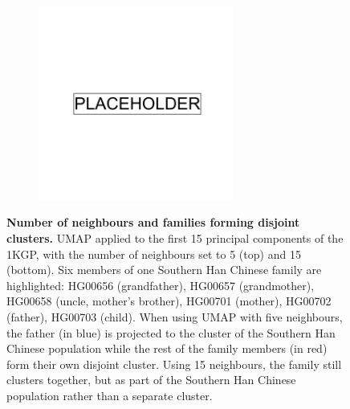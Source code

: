 \newpage

\begin{figure}
    \centering
    \begin{subfigure}{\textwidth}
    \includegraphics[width=0.7\textwidth]{placeholder.png}
    \end{subfigure}
    \caption[Number of neighbours and families forming disjoint clusters]{\textbf{Number of neighbours and families forming disjoint clusters.} UMAP applied to the first 15 principal components of the 1KGP, with the number of neighbours set to 5 (top) and 15 (bottom). Six members of one Southern Han Chinese family are highlighted: HG00656 (grandfather), HG00657 (grandmother), HG00658 (uncle, mother's brother), HG00701 (mother), HG00702 (father), HG00703 (child). When using UMAP with five neighbours, the father (in blue) is projected to the cluster of the Southern Han Chinese population while the rest of the family members (in red) form their own disjoint cluster. Using 15 neighbours, the family still clusters together, but as part of the Southern Han Chinese population rather than a separate cluster.}
    \label{fig:supp_1kgp_families}
\end{figure}

\newpage

